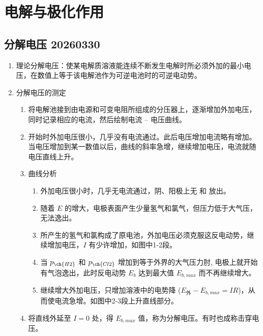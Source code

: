 \section{电解与极化作用}

\subsection{分解电压 20260330}

\begin{enumerate}
    \item 理论分解电压：使某电解质溶液能连续不断发生电解时所必须外加的最小电压，在数值上等于该电解池作为可逆电池时的可逆电动势。
    \item 分解电压的测定
    \begin{enumerate}
        \item 将电解池接到由电源和可变电阻所组成的分压器上，逐渐增加外加电压，同时记录相应的电流，然后绘制电流 -- 电压曲线。 %
        \item 开始时外加电压很小，几乎没有电流通过。此后电压增加电流略有增加。当电压增加到某一数值以后，曲线的斜率急增，继续增加电压，电流就随电压直线上升。
        \item 曲线分析
        \begin{enumerate}
            \item 外加电压很小时，几乎无电流通过，阴、阳极上无  和  放出。
            \item 随着 $ E $ 的增大，电极表面产生少量氢气和氯气，但压力低于大气压，无法逸出。
            \item 所产生的氢气和氯构成了原电池，外加电压必须克服这反电动势，继续增加电压，$ I $ 有少许增加，如图中1-2段。
            \item 当 $ p_{\ch{H2}} $ 和 $ p_{\ch{Cl2}} $ 增加到等于外界的大气压力肘, 电极上就开始有气泡逸出，此时反电动势 $ E_b $ 达到最大值 $ E_{b, max} $ 而不再继续增大。
            \item 继续增大外加电压，只增加溶液中的电势降 ($ E_{\text{外}} - E_{b, max} = IR $)，从而使电流急增。如图中2-3段上升直线部分。
        \end{enumerate} 
        \item 将直线外延至 $ I = 0 $ 处，得 $ E_{b, max} $ 值，称为分解电压。有时也成称击穿电压。
    \end{enumerate}
    \begin{figure}[h]
         \begin{minipage}[t]{0.40\textwidth}
            \centering

\end{minipage}
\end{figure}
\end{enumerate}
